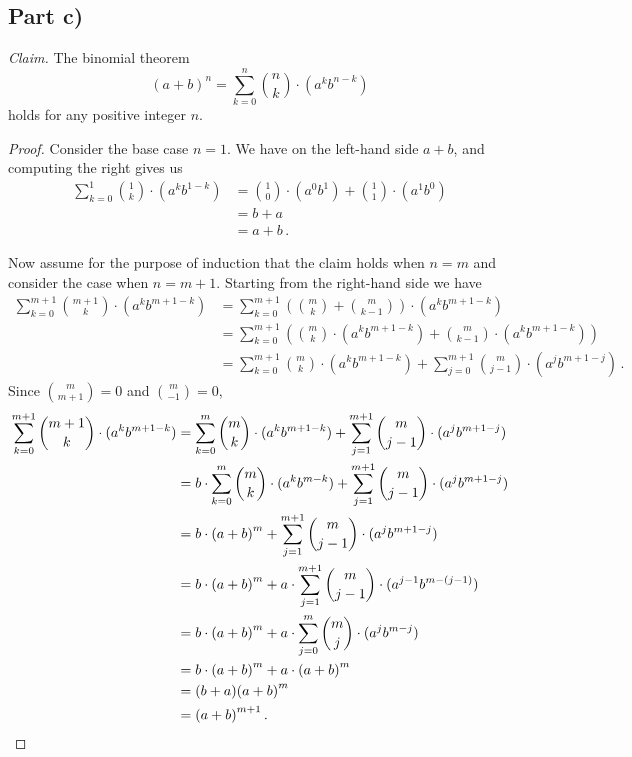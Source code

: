 \documentclass{abrice}
\begin{document}
\subsection{Part c)}

\emph{Claim.} The binomial theorem
\[
  {(a + b)}^n = \sum_{k=0}^n {n \choose k} \cdot (a^k b^{n-k})
\]
holds for any positive integer $n$.

\begin{proof}
  Consider the base case $n = 1$. We have on the left-hand side $a + b$, and
  computing the right gives us
  \begin{align*}
    \sum_{k=0}^1 {1 \choose k} \cdot (a^k b^{1-k})
    &= {1 \choose 0} \cdot (a^0b^1) + {1 \choose 1} \cdot (a^1b^0) \\
    &= b + a \\
    &= a + b\, .
  \end{align*}

  Now assume for the purpose of induction that the claim holds when $n = m$ and
  consider the case when $n = m + 1$. Starting from the right-hand side we have
  \begin{align*}
    \sum_{k=0}^{m+1} {m + 1 \choose k} \cdot (a^k b^{m+1-k})
    &= \sum_{k=0}^{m+1} \left(  {m \choose k} + {m \choose k-1 } \right) \cdot
      (a^k b^{m+1-k}) \\
    &= \sum_{k=0}^{m+1} \left( {m \choose k} \cdot (a^k b^{m+1-k}) + {m \choose k-1}
      \cdot (a^k b^{m+1-k})  \right) \\
    &= \sum_{k=0}^{m+1} {m \choose k} \cdot (a^k b^{m+1-k}) + \sum_{j=0}^{m+1} {m \choose j-1}
      \cdot (a^j b^{m+1-j})\, .
  \end{align*}
  Since ${m \choose m + 1} = 0$ and ${m \choose -1} = 0$,
  \begin{align*}
    \sum_{k=0}^{m+1} {m + 1 \choose k} \cdot (a^k b^{m+1-k})
    &= \sum_{k=0}^{m} {m \choose k} \cdot (a^k b^{m+1-k}) + \sum_{j=1}^{m+1} {m \choose j-1}
      \cdot (a^j b^{m+1-j}) \\
    &= b \cdot \sum_{k=0}^{m} {m \choose k} \cdot (a^k b^{m-k}) +
      \sum_{j=1}^{m+1} {m \choose j-1}
      \cdot (a^j b^{m+1-j}) \\
    &= b \cdot {(a + b)}^m + \sum_{j=1}^{m+1} {m \choose j-1} \cdot (a^j
      b^{m+1-j}) \\
    &= b \cdot {(a + b)}^m + a \cdot \sum_{j=1}^{m+1} {m \choose j-1} \cdot
      (a^{j-1} b^{m-(j-1)}) \\
    &= b \cdot {(a + b)}^m + a \cdot \sum_{j=0}^{m} {m \choose j} \cdot
      (a^{j} b^{m-j}) \\
    &= b \cdot {(a + b)}^m + a \cdot {(a + b)}^m \\
    &= (b + a){(a + b)}^m \\
    &= {(a + b)}^{m+1}\, . \qedhere
  \end{align*}
\end{proof}
\end{document}
